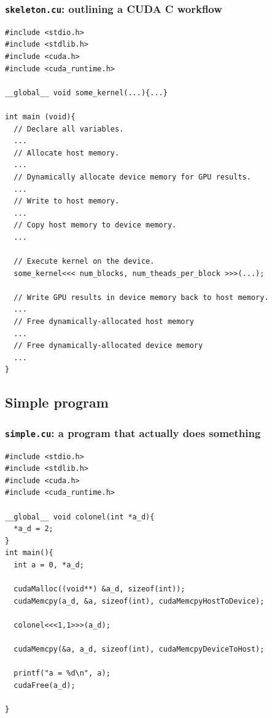 \documentclass[handout]{beamer}
\numberwithin{equation}{section}
\begin{document}
\begin{frame}[fragile]
\frametitle{{\tt skeleton.cu}: outlining a CUDA C workflow} \lstset{basicstyle=\tiny}
\begin{lstlisting}
#include <stdio.h> 
#include <stdlib.h> 
#include <cuda.h>
#include <cuda_runtime.h> 

__global__ void some_kernel(...){...}

int main (void){ 
  // Declare all variables.
  ...
  // Allocate host memory.
  ...
  // Dynamically allocate device memory for GPU results.
  ...
  // Write to host memory.
  ... 
  // Copy host memory to device memory.
  ...

  // Execute kernel on the device.
  some_kernel<<< num_blocks, num_theads_per_block >>>(...);
  
  // Write GPU results in device memory back to host memory.
  ...
  // Free dynamically-allocated host memory
  ...
  // Free dynamically-allocated device memory    
  ...
}
\end{lstlisting}
\end{frame}


\subsection{Simple program}

\begin{frame}[fragile]
\frametitle{{\tt simple.cu}: a program that actually does something} \lstset{basicstyle=\tiny}
\begin{lstlisting}
#include <stdio.h>
#include <stdlib.h>
#include <cuda.h>
#include <cuda_runtime.h> 

__global__ void colonel(int *a_d){
  *a_d = 2;
}
int main(){
  int a = 0, *a_d;
  
  cudaMalloc((void**) &a_d, sizeof(int));
  cudaMemcpy(a_d, &a, sizeof(int), cudaMemcpyHostToDevice);

  colonel<<<1,1>>>(a_d); 
  
  cudaMemcpy(&a, a_d, sizeof(int), cudaMemcpyDeviceToHost);

  printf("a = %d\n", a);
  cudaFree(a_d);

}
\end{lstlisting}
\end{frame}
\end{document}
